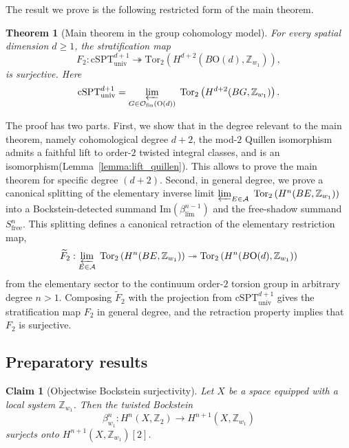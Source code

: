 \documentclass[aps,prx,reprint,superscriptaddress,twocolumn,amsmath,amssymb,amsfonts, nofootinbib]{revtex4-2}
\newcommand{\csptu}{\mathrm{cSPT}^{d+1}_{\mathrm{univ}}}
\newcommand{\ofin}{\mathcal{O}_{\text{fin}}}
\newcommand{\tor}{\text{Tor}}
\newcommand{\Z}{\mathbb{Z}}
\theoremstyle{apsstyle}
\newtheorem{theorem}{Theorem}[section]
\newtheorem{claim}{Claim}
\begin{document}
\bigskip 

The result we prove is the following restricted form of the main theorem.

\begin{theorem}[Main theorem in the group cohomology model]
\label{appG:main_theorem}
For every spatial dimension $d\geq 1$, the stratification map
\begin{equation}
F_2:\csptu \twoheadrightarrow \tor_{2}\left(H^{d+2}(B\mathrm{O}(d),\Z_{w_1})\right),
\end{equation}
is surjective. Here 
\begin{equation*}
\csptu=\varprojlim\limits_{G\in \ofin(\mathrm{O}(d))} \; \tor_{2} \left(H^{d+2}(BG,\Z_{w_1})\right).
\end{equation*}
\end{theorem}

\bigskip 

\noindent The proof has two parts. First, we show that in the degree relevant to the main theorem, namely cohomological degree $d+2$, the mod-$2$ Quillen isomorphism admits a faithful lift to order-$2$ twisted integral classes, and is an isomorphism(Lemma~\ref{lemma:lift_quillen}). This allows to prove the main theorem for specific degree $(d+2)$. Second, in general degree, we prove a canonical splitting of the elementary inverse limit $\varprojlim_{E\in \mathcal{A}} \;  \tor_{2} \left(H^{n}(BE,\Z_{w_1})\right)$ into a Bockstein-detected summand $\mathrm{Im}(\beta_{\lim}^{n-1})$ and the free-shadow summand $S_{\mathrm{free}}^{n}$. This splitting defines a canonical retraction of the elementary restriction map,
\begin{equation*}
\widetilde F_2: \varprojlim_{E\in \mathcal{A}} \;  \tor_{2} \left(H^{n}(BE,\Z_{w_1})\right)\twoheadrightarrow \tor_{2}\left(H^{n}(B\mathrm{O}(d),\Z_{w_1})\right)
\end{equation*}
from the elementary sector to the continuum order-$2$ torsion group in arbitrary degree $n>1$. Composing $\widetilde F_2$ with the projection from $\csptu$ gives the stratification map $F_2$ in general degree, and the retraction property implies that $F_2$ is surjective.


\subsection{Preparatory results}
\label{app:main_theorem_prep}

\begin{claim}[Objectwise Bockstein surjectivity]
\label{claim:objectwise_bockstein_surjective}
Let $X$ be a space equipped with a local system $\mathbb Z_{w_1}$. Then the twisted Bockstein
\begin{equation*}
\beta^{n}_{w_1}:H^n(X,\mathbb Z_2)\to H^{n+1}(X,\mathbb Z_{w_1})
\end{equation*}
surjects onto $H^{n+1}(X,\mathbb Z_{w_1})[2]$.
\end{claim}
\end{document}
